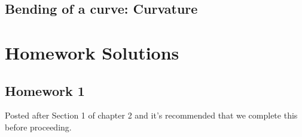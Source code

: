 \documentclass[oneside]{book}\twocolumn
\begin{document}
\section{Bending of a curve: Curvature}






























\onecolumn
\chapter{Homework Solutions}
\section{Homework 1}
Posted after Section 1 of chapter 2 and it's  recommended that we complete this before proceeding. 
\end{document}
